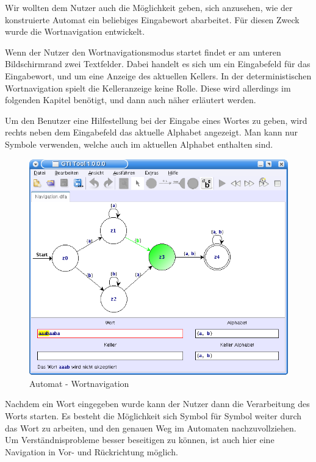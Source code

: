 Wir wollten dem Nutzer auch die Möglichkeit geben, sich anzusehen, wie der
konstruierte Automat ein beliebiges Eingabewort abarbeitet. Für diesen Zweck
wurde die Wortnavigation entwickelt.\vspace{10pt}

Wenn der Nutzer den Wortnavigationsmodus startet findet er am unteren
Bildschirmrand zwei Textfelder. Dabei handelt es sich um ein Eingabefeld für
das Eingabewort, und um eine Anzeige des aktuellen Kellers. In der
deterministischen Wortnavigation spielt die Kelleranzeige keine Rolle. Diese
wird allerdings im folgenden Kapitel benötigt, und dann auch näher erläutert
werden.\vspace{10pt}

Um den Benutzer eine Hilfestellung bei der Eingabe eines Wortes zu geben, wird
rechts neben dem Eingabefeld das aktuelle Alphabet angezeigt. Man kann nur
Symbole verwenden, welche auch im aktuellen Alphabet enthalten
sind.\vspace{10pt}

  \begin{figure}[h]
  \begin{center}
  \includegraphics[width=12cm]{../images/dfa_navigation.png}
  \caption{Automat - Wortnavigation}
  \end{center}
  \end{figure}

Nachdem ein Wort eingegeben wurde kann der Nutzer dann die Verarbeitung des
Worts starten. Es besteht die Möglichkeit sich Symbol für Symbol weiter durch
das Wort zu arbeiten, und den genauen Weg im Automaten nachzuvollziehen. Um
Verständnisprobleme besser beseitigen zu können, ist auch hier eine Navigation
in Vor- und Rückrichtung möglich.\vspace{10pt}
\vspace{10pt}

